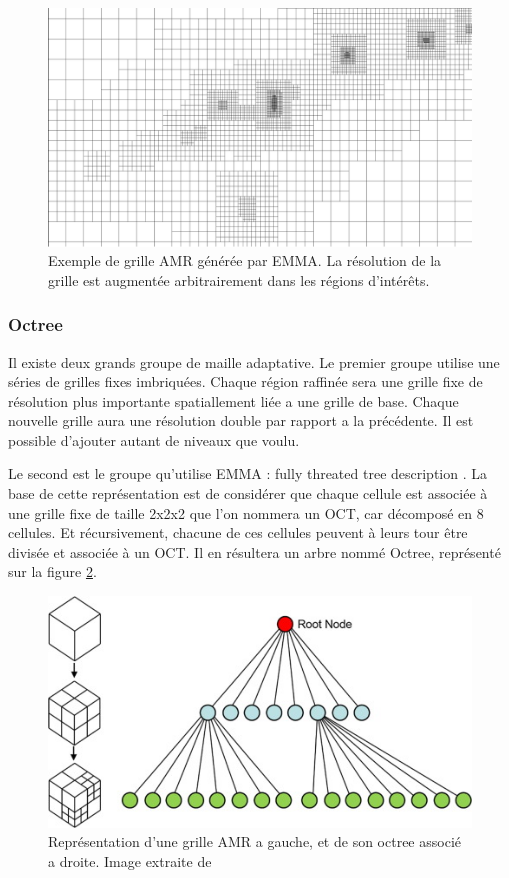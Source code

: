 \begin{figure}[bth]
        \includegraphics[width=.95\linewidth]{img/02/AMR.pdf} 
        \caption{Exemple de grille \ac{AMR} générée par EMMA. 
        La  résolution de la grille est augmentée arbitrairement dans les régions d'intérêts.
}
 		\label{fig:AMR}
\end{figure}

\subsubsection{Octree}

Il existe deux grands groupe de maille adaptative.
Le premier groupe utilise une séries de grilles fixes imbriquées. %
Chaque région raffinée sera une grille fixe de résolution plus importante spatiallement liée a une grille de base.
Chaque nouvelle grille aura une résolution double par rapport a la précédente.
Il est possible d'ajouter autant de niveaux que voulu.

Le second est le groupe qu'utilise EMMA : fully threated tree description \citep{khokhlov_fully_1998-1}.
La base de cette représentation est de considérer que chaque cellule est associée à une grille fixe de taille 2x2x2 que l'on nommera un OCT, car décomposé en 8 cellules.
Et récursivement, chacune de ces cellules peuvent à leurs tour être divisée et associée à un OCT.
Il en résultera un arbre nommé Octree, représenté sur la figure \ref{fig:octree}.

\begin{figure}[bth]
        \includegraphics[width=.95\linewidth]{img/02/octree.jpg} 
        \caption{Représentation d'une grille AMR a gauche, et de son octree associé a droite. 
        Image extraite de \cite{SU201659}
     	\label{fig:octree}
}
\end{figure}

